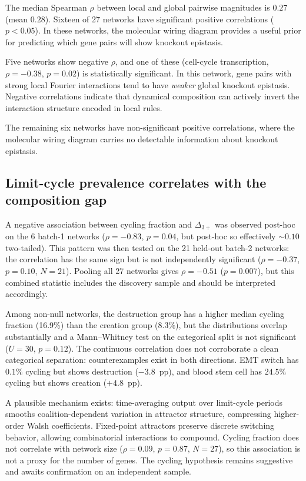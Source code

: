 \documentclass[10pt]{article}
\begin{document}
The median Spearman $\rho$ between local and global pairwise
magnitudes is $0.27$ (mean $0.28$). Sixteen of 27 networks have
significant positive correlations ($p < 0.05$). In these networks,
the molecular wiring diagram provides a useful prior for predicting
which gene pairs will show knockout epistasis.

Five networks show negative $\rho$, and one of these
(cell-cycle transcription, $\rho = -0.38$, $p = 0.02$) is
statistically significant. In this network, gene pairs with strong
local Fourier interactions tend to have \emph{weaker} global knockout
epistasis. Negative correlations indicate that dynamical composition
can actively invert the interaction structure encoded in local rules.

The remaining six networks have non-significant positive
correlations, where the molecular wiring diagram carries no detectable
information about knockout epistasis.


\subsection{Limit-cycle prevalence correlates with the composition gap}
\label{sec:cycling}

A negative association between cycling fraction and $\Delta_{3+}$ was
observed post-hoc on the 6 batch-1 networks ($\rho = -0.83$,
$p = 0.04$, but post-hoc so effectively $\sim 0.10$ two-tailed).
This pattern was then tested on the 21 held-out batch-2 networks:
the correlation has the same sign but is not independently
significant ($\rho = -0.37$, $p = 0.10$, $N = 21$). Pooling all 27
networks gives $\rho = -0.51$ ($p = 0.007$), but this combined
statistic includes the discovery sample and should be interpreted
accordingly.

Among non-null networks, the destruction group has a higher median
cycling fraction (16.9\%) than the creation group (8.3\%), but the
distributions overlap substantially and a Mann--Whitney test on the
categorical split is not significant ($U = 30$, $p = 0.12$). The
continuous correlation does not corroborate a clean categorical
separation: counterexamples exist in both directions. EMT switch has
$0.1\%$ cycling but shows destruction ($-3.8$~pp), and blood stem
cell has $24.5\%$ cycling but shows creation ($+4.8$~pp).

A plausible mechanism exists: time-averaging output over limit-cycle
periods smooths coalition-dependent variation in attractor structure,
compressing higher-order Walsh coefficients. Fixed-point attractors
preserve discrete switching behavior, allowing combinatorial
interactions to compound. Cycling fraction does not correlate with
network size ($\rho = 0.09$, $p = 0.87$, $N = 27$), so this
association is not a proxy for the number of genes. The cycling
hypothesis remains suggestive and awaits confirmation on an
independent sample.
\end{document}
